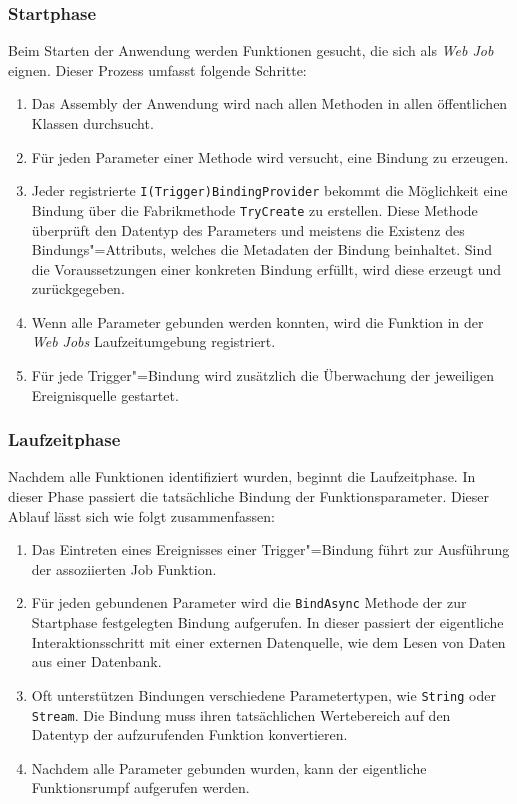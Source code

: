 \subsubsection{Startphase}

Beim Starten der Anwendung werden Funktionen gesucht, die sich als \textit{Web Job} eignen. Dieser Prozess umfasst folgende Schritte:

\begin{enumerate}
	\item Das Assembly der Anwendung wird nach allen Methoden in allen öffentlichen Klassen durchsucht.
	\item Für jeden Parameter einer Methode wird versucht, eine Bindung zu erzeugen.
	\item Jeder registrierte \lstinline{I(Trigger)BindingProvider} bekommt die Möglichkeit eine Bindung über die Fabrikmethode \lstinline{TryCreate} zu erstellen. Diese Methode überprüft den Datentyp des Parameters und meistens die Existenz des Bindungs"=Attributs, welches die Metadaten der Bindung beinhaltet. Sind die Voraussetzungen einer konkreten Bindung erfüllt, wird diese erzeugt und zurückgegeben.
	\item Wenn alle Parameter gebunden werden konnten, wird die Funktion in der \textit{Web Jobs} Laufzeitumgebung registriert.
	\item Für jede Trigger"=Bindung wird zusätzlich die Überwachung der jeweiligen Ereignisquelle gestartet.
\end{enumerate}

\subsubsection{Laufzeitphase}

Nachdem alle Funktionen identifiziert wurden, beginnt die Laufzeitphase. In dieser Phase passiert die tatsächliche Bindung der Funktionsparameter. Dieser Ablauf lässt sich wie folgt zusammenfassen:

\begin{enumerate}
	\item Das Eintreten eines Ereignisses einer Trigger"=Bindung führt zur Ausführung der assoziierten Job Funktion.
	\item Für jeden gebundenen Parameter wird die \lstinline{BindAsync} Methode der zur Startphase festgelegten Bindung aufgerufen. In dieser passiert der eigentliche Interaktionsschritt mit einer externen Datenquelle, wie \zB dem Lesen von Daten aus einer Datenbank.
	\item Oft unterstützen Bindungen verschiedene Parametertypen, wie \zB \lstinline{String} oder \lstinline{Stream}. Die Bindung muss ihren tatsächlichen Wertebereich auf den Datentyp der aufzurufenden Funktion konvertieren.
	\item Nachdem alle Parameter gebunden wurden, kann der eigentliche Funktionsrumpf aufgerufen werden.
\end{enumerate}

